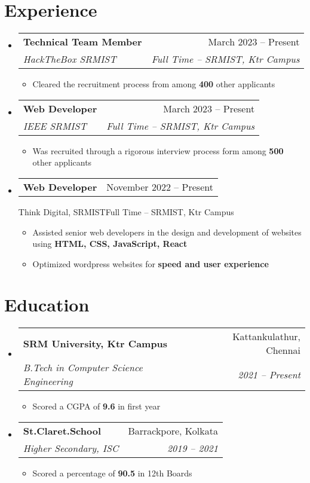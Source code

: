 \documentclass[a4paper,11pt]{article}
\makeatletter
\newcommand{\resumeItem}[1]{
  \item\small{#1}
}
\newcommand{\resumeItemListStart}{\begin{itemize}[rightmargin=0.11in]}
\newcommand{\resumeItemListEnd}{\end{itemize}}
\newcommand{\resumeQuadHeading}[4]{
  \item
  \begin{tabular*}{0.96\textwidth}[t]{l@{\extracolsep{\fill}}r}
    \textbf{#1} & #2 \\
    \textit{\small#3} & \textit{\small #4} \\
  \end{tabular*}
}
\newcommand{\resumeQuadHeadingChild}[2]{
  \item
  \begin{tabular*}{0.96\textwidth}[t]{l@{\extracolsep{\fill}}r}
    \textbf{\small#1} & {\small#2} \\
  \end{tabular*}
}
\newcommand{\resumeHeadingListStart}{
  \begin{itemize}[leftmargin=0.15in, label={}]
}
\newcommand{\resumeHeadingListEnd}{\end{itemize}}
\makeatother
\begin{document}

\section{Experience}
\resumeHeadingListStart{}
  \resumeQuadHeading{Technical Team Member}{March 2023 -- Present}
  {HackTheBox SRMIST}{Full Time  -- SRMIST, Ktr Campus}
    \resumeItemListStart{}
      \resumeItem{Cleared the recruitment process from among \textbf{400} other applicants}
    \resumeItemListEnd{}

  \resumeQuadHeading{Web Developer}{March 2023 -- Present}
  {IEEE SRMIST}{Full Time  -- SRMIST, Ktr Campus}
    \resumeItemListStart{}
       \resumeItem{Was recruited through a rigorous interview process form among \textbf{500} other applicants}
    \resumeItemListEnd{}

  \resumeQuadHeadingChild{Web Developer}{November 2022 -- Present}
  {Think Digital, SRMIST}{Full Time -- SRMIST, Ktr Campus}
    \resumeItemListStart{}
      \resumeItem{Assisted senior web developers in the design and development of websites using \textbf{HTML, CSS, JavaScript, React}}
      \resumeItem{Optimized wordpress websites for \textbf{speed and user experience}}
    \resumeItemListEnd{}

\resumeHeadingListEnd{}



\section{Education}
  \resumeHeadingListStart{}
    \resumeQuadHeading{SRM University, Ktr Campus}{Kattankulathur, Chennai}
    {B.Tech in Computer Science Engineering}{2021 -- Present}
    \resumeItemListStart{}
      \resumeItem{Scored a CGPA of \textbf{9.6} in first year}
    \resumeItemListEnd{}
  \resumeHeadingListEnd{}

  \resumeHeadingListStart{}
    \resumeQuadHeading{St.Claret.School}{Barrackpore, Kolkata}
    {Higher Secondary, ISC}{2019 -- 2021}
    \resumeItemListStart{}
      \resumeItem{Scored a percentage of \textbf{90.5} in 12th Boards}
    \resumeItemListEnd{}
  \resumeHeadingListEnd{}
\end{document}
